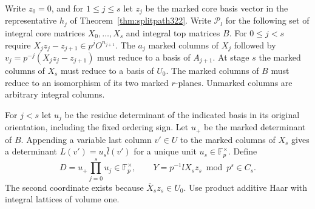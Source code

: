 \documentclass[a4paper,11pt]{article}
\theoremstyle{definition}
\theoremstyle{remark}
\numberwithin{equation}{section}
\begin{document}
Write \(z_0=0\), and for \(1\le j\le s\) let \(z_j\) be the marked
core basis vector in the representative \(h_j\) of
Theorem~\ref{thm:splitpath322}. Write \(\mathcal P_l\) for the following
set of integral core matrices \(X_0,\ldots,X_s\) and integral top
matrices \(B\).
For \(0\le j<s\) require \(X_jz_j-z_{j+1}\in p^jO^{n_{j+1}}\).
The \(a_j\) marked columns of \(X_j\) followed by
\(v_j=p^{-j}(X_jz_j-z_{j+1})\) must reduce to a basis of \(A_{j+1}\).
At stage \(s\) the marked columns of \(X_s\) must reduce to a basis of
\(U_0\). The marked columns of \(B\) must reduce to an isomorphism
of its two marked \(r\)-planes. Unmarked columns are arbitrary
integral columns.

For \(j<s\) let \(u_j\) be the residue determinant of the indicated
basis in its original orientation, including the fixed ordering sign.
Let \(u_+\) be the marked determinant of \(B\).
Appending a variable last column \(v'\in U\) to the marked columns
of \(X_s\) gives a determinant \(L(v')=u_s\bar l(v')\) for a unique
unit \(u_s\in\mathbb F_p^\times\). Define
\[
    D=u_+\prod_{j=0}^s u_j\in\mathbb F_p^\times,\qquad
    Y=p^{-1}lX_sz_s\bmod p^s\in C_s .
\]
The second coordinate exists because \(\bar X_sz_s\in U_0\).
Use product additive Haar with integral lattices of volume one.
\end{document}
